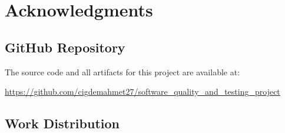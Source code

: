 \documentclass[12pt, a4paper]{article}
\begin{document}
\section{Acknowledgments}
\label{sec:acknowledgments}

\subsection{GitHub Repository}
The source code and all artifacts for this project are available at:
\begin{center}
    \url{https://github.com/cigdemahmet27/software_quality_and_testing_project}
\end{center}

\subsection{Work Distribution}
\end{document}
